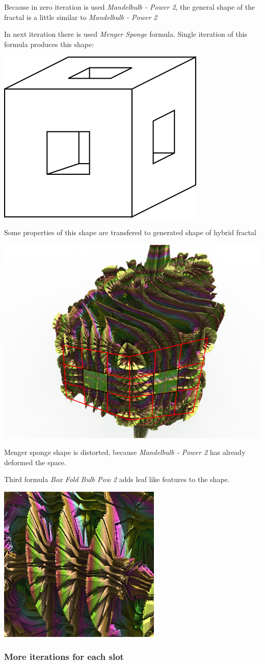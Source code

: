 Because in zero iteration is used \emph{Mandelbulb - Power 2}, the general shape
of the fractal is a little similar to \emph{Mandelbulb - Power 2}

In next iteration there is used \emph{Menger Sponge} formula. Single iteration
of this formula produces this shape:

\includegraphics[width=0.2\linewidth]{img/manual/media/single_iteration_of_menger_sponge.png}

Some properties of this shape are transfered to generated shape of hybrid
fractal

\includegraphics[width=0.5\linewidth]{img/manual/media/single_iteration_of_menger_sponge_hybrid.png}

Menger sponge shape is distorted, because \emph{Mandelbulb - Power 2} has
already deformed the space.

Third formula \emph{Box Fold Bulb Pow 2} adds leaf like features to the shape.

\includegraphics[width=0.4\linewidth]{img/manual/media/hybrid_sequence_example_1_leaf_shapes.png}

\subsubsection{More iterations for each slot}

